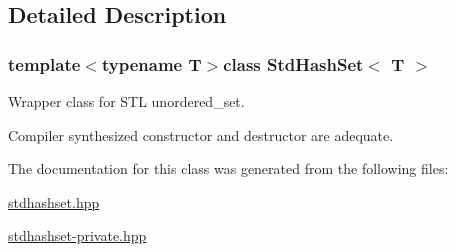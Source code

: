 \subsection{Detailed Description}
\subsubsection*{template$<$typename T$>$class Std\-Hash\-Set$<$ T $>$}

Wrapper class for S\-T\-L unordered\-\_\-set. 

Compiler synthesized constructor and destructor are adequate. 

The documentation for this class was generated from the following files\-:\begin{DoxyCompactItemize}
\item 
\hyperlink{stdhashset_8hpp}{stdhashset.\-hpp}\item 
\hyperlink{stdhashset-private_8hpp}{stdhashset-\/private.\-hpp}\end{DoxyCompactItemize}
